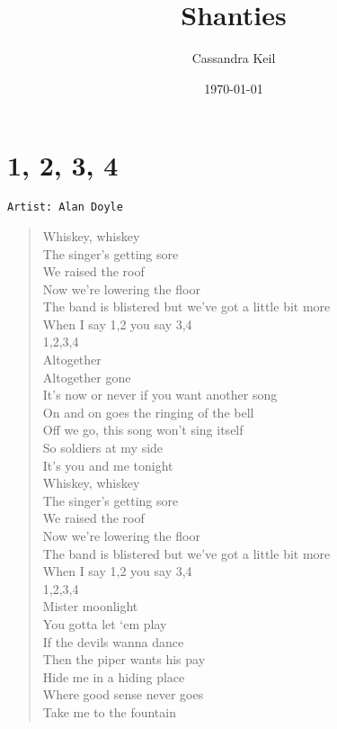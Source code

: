 \documentclass[11pt]{article}
\author{Cassandra Keil}
\date{\today}
\title{Shanties}
\begin{document}
\maketitle
\tableofcontents

\clearpage
\section{1, 2, 3, 4}
\label{sec:org8e9c24d}
\begin{verbatim}
Artist: Alan Doyle
\end{verbatim}
\begin{verse}
Whiskey, whiskey\\
The singer’s getting sore\\
We raised the roof\\
Now we’re lowering the floor\\
The band is blistered but we’ve got a little bit more\\
When I say 1,2 you say 3,4\\
1,2,3,4\\
\vspace*{1em}
Altogether\\
Altogether gone\\
It’s now or never if you want another song\\
On and on goes the ringing of the bell\\
Off we go, this song won’t sing itself\\
So soldiers at my side\\
It’s you and me tonight\\
Whiskey, whiskey\\
The singer’s getting sore\\
We raised the roof\\
Now we’re lowering the floor\\
The band is blistered but we’ve got a little bit more\\
When I say 1,2 you say 3,4\\
1,2,3,4\\
\vspace*{1em}
Mister moonlight\\
You gotta let ‘em play\\
If the devils wanna dance\\
Then the piper wants his pay\\
Hide me in a hiding place\\
Where good sense never goes\\
Take me to the fountain\\

\end{verse}
\end{document}
